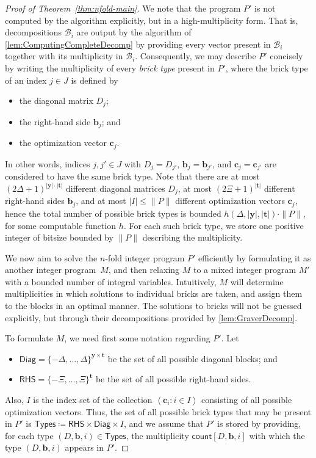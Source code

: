 \documentclass{article}
\renewcommand{\leq}{\leqslant}
\newcommand{\Bb}{\mathcal{B}}
\newcommand{\tup}[1]{{\mathbf{#1}}}
\newcommand{\yy}{\tup y}
\newcommand{\tv}{\tup t}
\newcommand{\bb}{\tup b}
\newcommand{\cc}{\tup c}
\newcommand{\matrices}[3]{#1^{#2\times #3}}
\newcommand{\mset}[1]{\left\langle #1\right\rangle}
\newcommand{\RHS}{\mathsf{RHS}}
\newcommand{\Diag}{\mathsf{Diag}}
\newcommand{\Types}{\mathsf{Types}}
\newcommand{\cntTypes}{\mathsf{count}}
\begin{document}
\begin{proof}[Proof of Theorem~\ref{thm:nfold-main}]
We note that the program $P'$ is not computed by the algorithm explicitly, but in a high-multiplicity form. That is, decompositions $\Bb_i$ are output by the algorithm of \cref{lem:ComputingCompleteDecomp} by providing every vector present in $\Bb_i$ together with its multiplicity in $\Bb_i$. Consequently, we may describe $P'$ concisely by writing the multiplicity of every {\em{brick type}} present in $P'$, where the brick type of an index $j\in J$ is defined by
\begin{itemize}[nosep]
    \item the diagonal matrix $D_{j}$;
    \item the right-hand side $\bb_{j}$; and
    \item the optimization vector $\cc_{j}$.
\end{itemize}
In other words, indices $j,j'\in J$ with $D_j=D_{j'}$, $\bb_j=\bb_{j'}$, and $\cc_j=\cc_{j'}$ are considered to have the same brick type. Note that there are at most $(2\Delta+1)^{|\yy|\cdot |\tv|}$ different diagonal matrices $D_j$, at most $(2\Xi+1)^{|\tv|}$ different right-hand sides $\bb_j$, and at most $|I|\leq \|P\|$ different optimization vectors $\cc_j$, hence the total number of possible brick types is bounded $h(\Delta,|\yy|,|\tv|)\cdot \|P\|$, for some computable function $h$. For each such brick type, we store one positive integer of bitsize bounded by $\|P\|$ describing the multiplicity.

We now aim to solve the $n$-fold integer program $P'$ efficiently by formulating it as another integer program~$M$, and then relaxing $M$ to a mixed integer program $M'$ with a bounded number of integral variables. Intuitively, $M$ will determine multiplicities in which solutions to individual bricks are taken, and assign them to the blocks in an optimal manner. The solutions to bricks will not be guessed explicitly, but through their decompositions provided by \cref{lem:GraverDecomp}.

To formulate $M$, we need first some notation regarding $P'$. Let
\begin{itemize}[nosep]
    \item $\Diag=\matrices{\{-\Delta,\ldots,\Delta\}}{\yy}{\tv}$ be the set of all possible diagonal blocks; and
    \item $\RHS=\{-\Xi,\ldots,\Xi\}^\tv$ be the set of all possible right-hand sides.
\end{itemize}
Also, $I$ is the index set of the collection $\mset{\cc_i\colon i\in I}$ consisting of all possible optimization vectors.
Thus, the set of all possible brick types that may be present in $P'$ is $\Types\coloneqq \RHS\times \Diag\times I$, and we assume that $P'$ is stored by providing, for each type $(D,\bb,i)\in \Types$, the multiplicity $\cntTypes[D,\bb,i]$ with which the type $(D,\bb,i)$ appears in $P'$.


\end{proof}
\end{document}
